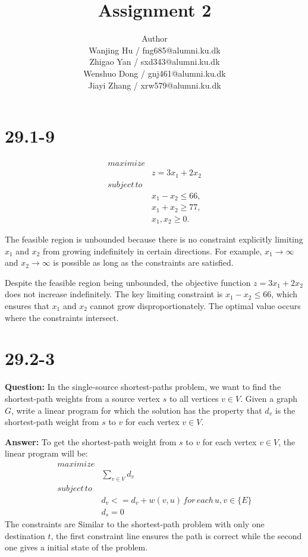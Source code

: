 \documentclass[12pt]{article}
\title{Assignment 2}
\author{Author \\
  Wanjing Hu / fng685@alumni.ku.dk  \\
  Zhigao Yan / sxd343@alumni.ku.dk  \\
  Wenshuo Dong / gnj461@alumni.ku.dk  \\
  Jiayi Zhang / xrw579@alumni.ku.dk \\
}
\begin{document}
\maketitle

\section{29.1-9}
\[
\begin{aligned}
maximize& \\
& z = 3x_1 + 2x_2 \\
subject \, to&  \\
& x_1 - x_2 \leq 66, \\ 
& x_1 + x_2 \geq 77,\\
& x_1, x_2 \geq 0.
\end{aligned}
\]

The feasible region is unbounded because there is no constraint explicitly limiting \(x_1\) and \(x_2\) from growing indefinitely in certain directions.
For example, \(x_1 \to \infty\) and \(x_2 \to \infty\) is possible as long as the constraints are satisfied.

Despite the feasible region being unbounded, the objective function \(z = 3x_1 + 2x_2\) does not increase indefinitely. The key limiting constraint is \(x_1 - x_2 \leq 66\), which ensures that \(x_1\) and \(x_2\) cannot grow disproportionately. The optimal value occurs where the constraints intersect.
\section{29.2-3}
\textbf{Question:}
In the single-source shortest-paths problem, we want to find the shortest-path weights from a source vertex $s$ to all vertices $v \in V $. Given a graph $G$, write a linear program for which the solution has the property that $d_{v}$ is the shortest-path weight from $s$ to $v$ for each vertex $v \in V$.

\textbf{Answer:}
To get the shortest-path weight from $s$ to $v$ for each vertex $v \in V$, the linear program will be:
\begin{equation}
\begin{aligned}
maximize& \\
& \sum_{v \in V} d_{v}\\
subject \, to&  \\
& d_{v} <=  d_{v} + w(v, u)\, for \, each \, u,v \in \{E\} \\
& d_{s} = 0
\end{aligned}
\end{equation}
The constraints are Similar to the shortest-path problem with only one destination $t$, the first constraint line ensures the path is correct while the second one gives a initial state of the problem.
\end{document}

